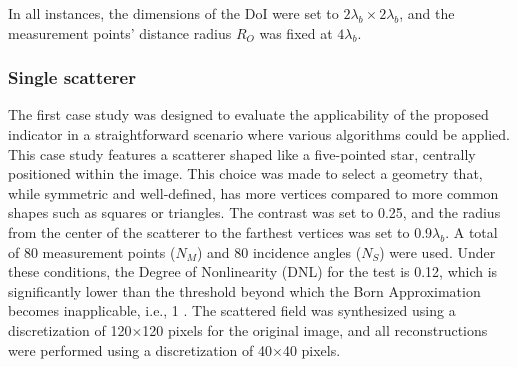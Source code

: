\documentclass{IEEEtran}
\begin{document}

            In all instances, the dimensions of the DoI were set to $2\lambda_b\times2\lambda_b$, and the measurement points' distance radius $R_O$ was fixed at $4\lambda_b$.

			\subsubsection{Single scatterer}\label{sec:results:shape:star}


                The first case study was designed to evaluate the applicability of the proposed indicator in a straightforward scenario where various algorithms could be applied. This case study features a scatterer shaped like a five-pointed star, centrally positioned within the image. This choice was made to select a geometry that, while symmetric and well-defined, has more vertices compared to more common shapes such as squares or triangles. The contrast was set to 0.25, and the radius from the center of the scatterer to the farthest vertices was set to 0.9$\lambda_b$. A total of 80 measurement points ($N_M$) and 80 incidence angles ($N_S$) were used. Under these conditions, the Degree of Nonlinearity (DNL) for the test is 0.12, which is significantly lower than the threshold beyond which the Born Approximation becomes inapplicable, i.e., 1 \cite{bucci2001degree}. The scattered field was synthesized using a discretization of 120$\times$120 pixels for the original image, and all reconstructions were performed using a discretization of 40$\times$40 pixels.
\end{document}
